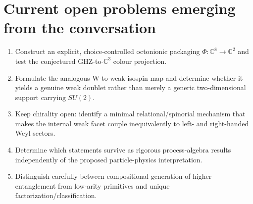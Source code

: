 \documentclass[11pt,a4paper]{article}
\begin{document}
\section{Current open problems emerging from the conversation}
\begin{enumerate}[leftmargin=*]
\item Construct an explicit, choice-controlled octonionic packaging $\Phi:\mathbb C^8\to\mathbb O^2$ and test the conjectured GHZ-to-$\mathbb C^3$ colour projection.
\item Formulate the analogous W-to-weak-isospin map and determine whether it yields a genuine weak doublet rather than merely a generic two-dimensional support carrying $SU(2)$.
\item Keep chirality open: identify a minimal relational/spinorial mechanism that makes the internal weak facet couple inequivalently to left- and right-handed Weyl sectors.
\item Determine which statements survive as rigorous process-algebra results independently of the proposed particle-physics interpretation.
\item Distinguish carefully between compositional generation of higher entanglement from low-arity primitives and unique factorization/classification.
\end{enumerate}
\end{document}
